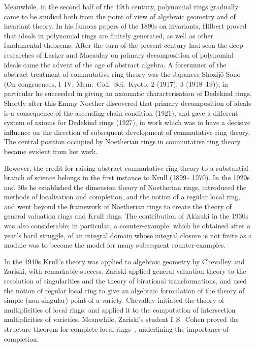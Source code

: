 Meanwhile, in the second half of the 19th century, polynomial rings
gradually came to be studied both from the point of view of algebraic
geometry and of invariant theory. In his famous papers of the 1890s on
invariants, Hilbert proved that ideals in polynomial rings are finitely
generated, as well as other fundamental theorems. After the turn of the
present century had seen the deep researches of Lasker and Macaulay on
primary decomposition of polynomial ideals came the advent of the age of
abstract algebra. A forerunner of the abstract treatment of commutative
ring theory was the Japanese Shozij\=o Sono (On congruences, I--IV, Mem.\
Coll.\ Sci.\ Kyoto, 2 (1917), 3 (1918--19)); in particular he succeeded in giving
an axiomatic characterisation of Dedekind rings. Shortly after this Emmy
Noether discovered that primary decomposition of ideals is a consequence
of the ascending chain condition (1921), and gave a different system of
axioms for Dedekind rings (1927), in work which was to have a decisive
influence on the direction of subsequent development of commutative ring
theory. The central position occupied by Noetherian rings in commutative
ring theory became evident from her work.

However, the credit for raising abstract commutative ring theory to a
substantial branch of science belongs in the first instance to Krull (1899--
1970). In the 1920s and 30s he established the dimension theory of
Noetherian rings, introduced the methods of localisation and completion,
and the notion of a regular local ring, and went beyond the framework of
Noetherian rings to create the theory of general valuation rings and Krull
rings. The contribution of Akizuki in the 1930s was also considerable; in
particular, a counter-example, which he obtained after a year's hard
struggle, of an integral domain whose integral closure is not finite as a
module was to become the model for many subsequent counter-examples.

In the 1940s Krull's theory was applied to algebraic geometry by
Chevalley and Zariski, with remarkable success. Zariski applied general
valuation theory to the resolution of singularities and the theory of
birational transformations, and used the notion of regular local ring to give
an algebraic formulation of the theory of simple (non-singular) point of a
variety. Chevalley initiated the theory of multiplicities of local rings, and
applied it to the computation of intersection multiplicities of varieties.
Meanwhile, Zariski's student I.\,S.\ Cohen proved the structure theorem for
complete local rings~\cite{Coh1}, underlining the importance of completion.

